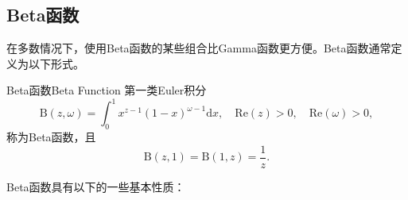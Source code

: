 \subsection{Beta函数}
在多数情况下，使用Beta函数\cite{Wiki-Beta-Function}的某些组合比Gamma函数更方便。Beta函数通常定义为以下形式。

\begin{definition}{Beta函数}{Beta Function}
	第一类Euler积分
	$$ \mathrm{B}\left(z,\omega\right) = \int_{0}^{1}{x^{z-1}\left(1-x\right)^{\omega-1}\mathrm{d}x},\quad  \mathrm{Re}\left(z\right)>0, \quad \mathrm{Re}\left(\omega\right)>0,$$
	称为Beta函数，且$$\mathrm{B}\left(z,1\right) = \mathrm{B}\left(1,z\right) = \frac{1}{z}.$$
\end{definition}

\begin{property}
	Beta函数具有以下的一些基本性质：
	\begin{enumerate}[noitemsep]
		

\end{enumerate}
\end{property}
